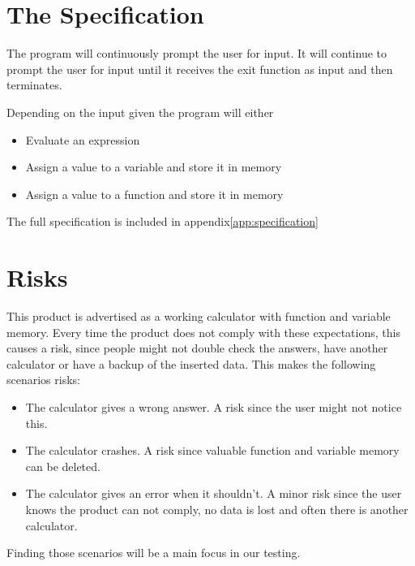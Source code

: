 \documentclass[11pt,a4paper]{article}
\begin{document}

\section{The Specification}


The program will continuously prompt the user for input. It will
continue to prompt the user for input until it receives the exit
function as input and then terminates.

Depending on the input given the program will either

\begin{itemize}
\item Evaluate an expression
\item Assign a value to a variable and store it in memory
\item Assign a value to a function and store it in memory
\end{itemize}
The full specification is included in appendix\ref{app:specification}

\section{Risks}
This product is advertised as a working calculator with function and
variable memory. Every time the product does not comply with these
expectations, this causes a risk, since people might not double check
the answers, have another calculator or have a backup of the inserted
data. This makes the following scenarios risks:



\begin{itemize}
	\item The calculator gives a wrong answer. A risk since the user might not notice this. %
	\item The calculator crashes. A risk since valuable function and variable memory can be deleted.
	\item The calculator gives an error when it shouldn't. A minor risk since the user knows the product can not comply, no data is lost and often there is another calculator. %
\end{itemize}
Finding those scenarios will be a main focus in our testing.
\end{document}

